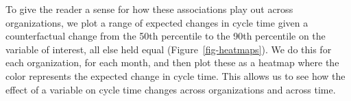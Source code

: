 \documentclass[manuscript,screen,review]{acmart}
\begin{document}
To give the reader a sense for how these associations play out across
organizations, we plot a range of expected changes in cycle time given a
counterfactual change from the 50th percentile to the 90th percentile on
the variable of interest, all else held equal
(Figure~\ref{fig-heatmaps}). We do this for each organization, for each
month, and then plot these as a heatmap where the color represents the
expected change in cycle time. This allows us to see how the effect of a
variable on cycle time changes across organizations and across time.

\begin{figure}

\begin{minipage}{0.33\linewidth}


\subcaption{\label{fig-heatmaps-coding}}

\end{minipage}%
%
\begin{minipage}{0.33\linewidth}

\end{minipage}
\end{figure}
\end{document}
